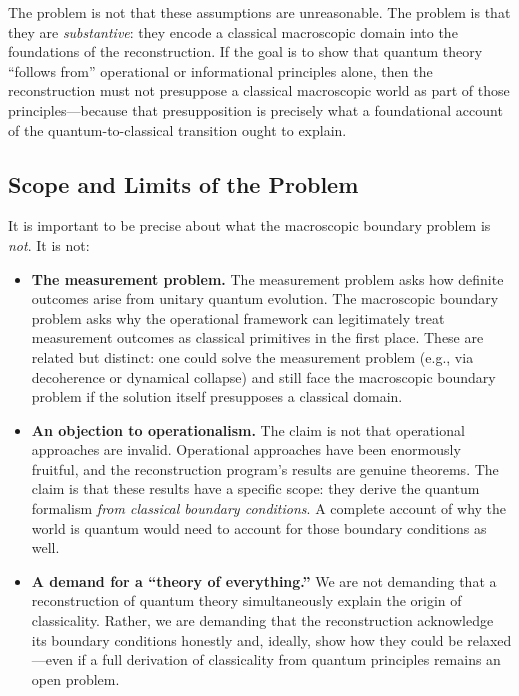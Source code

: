 \documentclass[pdflatex,sn-mathphys-num]{sn-jnl}%
\begin{document}
The problem is not that these assumptions are unreasonable. The problem is that they are \emph{substantive}: they encode a classical macroscopic domain into the foundations of the reconstruction. If the goal is to show that quantum theory ``follows from'' operational or informational principles alone, then the reconstruction must not presuppose a classical macroscopic world as part of those principles---because that presupposition is precisely what a foundational account of the quantum-to-classical transition ought to explain.

\subsection{Scope and Limits of the Problem}

It is important to be precise about what the macroscopic boundary problem is \emph{not}. It is not:

\begin{itemize}
\item \textbf{The measurement problem.} The measurement problem asks how definite outcomes arise from unitary quantum evolution. The macroscopic boundary problem asks why the operational framework can legitimately treat measurement outcomes as classical primitives in the first place. These are related but distinct: one could solve the measurement problem (e.g., via decoherence or dynamical collapse) and still face the macroscopic boundary problem if the solution itself presupposes a classical domain.

\item \textbf{An objection to operationalism.} The claim is not that operational approaches are invalid. Operational approaches have been enormously fruitful, and the reconstruction program's results are genuine theorems. The claim is that these results have a specific scope: they derive the quantum formalism \emph{from classical boundary conditions}. A complete account of why the world is quantum would need to account for those boundary conditions as well.

\item \textbf{A demand for a ``theory of everything.''} We are not demanding that a reconstruction of quantum theory simultaneously explain the origin of classicality. Rather, we are demanding that the reconstruction acknowledge its boundary conditions honestly and, ideally, show how they could be relaxed---even if a full derivation of classicality from quantum principles remains an open problem.
\end{itemize}
\end{document}
